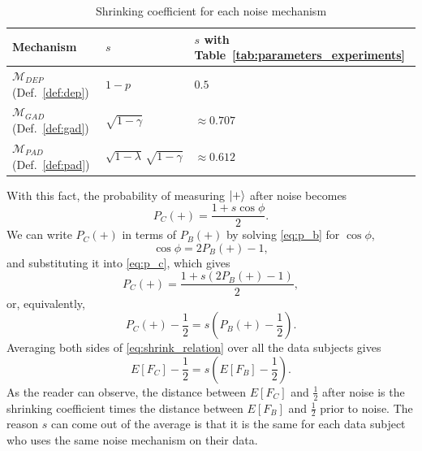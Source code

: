 \documentclass{ieeeaccess}
\begin{document}
\begin{table}[H]
  \caption{Shrinking coefficient for each noise mechanism}
  \label{tab:shrinking_coefficient}
  \centering
  \begin{tabular}{lll}
    \toprule
    Mechanism & $s$ & $s$ with Table~\ref{tab:parameters_experiments} \\
    \midrule
    $\mathcal{M}_{DEP}$ (Def.~\ref{def:dep}) & $1 - p$ & $0.5$ \\
    $\mathcal{M}_{GAD}$ (Def.~\ref{def:gad}) & $\sqrt{1 - \gamma}$ & $\approx 0.707$ \\
    $\mathcal{M}_{PAD}$ (Def.~\ref{def:pad}) & $\sqrt{1 - \lambda}\,\sqrt{1 - \gamma}$ & $\approx 0.612$ \\
    \bottomrule
  \end{tabular}
\end{table}

With this fact, the probability of measuring $\ket{+}$ after noise becomes
\begin{equation}
  P_C(+) = \frac{1+s\cos\phi}{2}.
  \label{eq:p_c}
\end{equation}
We can write $P_C(+)$ in terms of $P_B(+)$ by solving \eqref{eq:p_b} for $\cos\phi$,
\begin{equation}
  \cos\phi = 2P_B(+) - 1,
  \label{eq:cos_phi}
\end{equation}
and substituting it into \eqref{eq:p_c}, which gives
\begin{equation}
  P_C(+) = \frac{1+s\left(2P_B(+) - 1\right)}{2},
  \label{eq:p_c_of_p_b}
\end{equation}
or, equivalently,
\begin{equation}
  P_C(+) - \frac{1}{2} = s\left(P_B(+) - \frac{1}{2}\right).
  \label{eq:shrink_relation}
\end{equation}
Averaging both sides of \eqref{eq:shrink_relation} over all the data subjects gives
\begin{equation}
  E[F_C] - \frac{1}{2} = s\left(E[F_B] - \frac{1}{2}\right).
  \label{eq:expected_shrink}
\end{equation}
As the reader can observe, the distance between $E[F_C]$ and $\frac{1}{2}$ after noise is the shrinking coefficient times the distance between $E[F_B]$ and $\frac{1}{2}$ prior to noise. The reason $s$ can come out of the average is that it is the same for each data subject who uses the same noise mechanism on their data.
\end{document}
